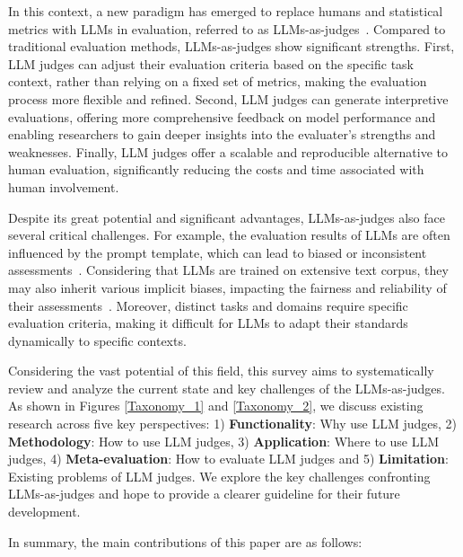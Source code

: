 In this context, a new paradigm has emerged to replace humans and statistical metrics with LLMs in evaluation, referred to as LLMs-as-judges~\cite{ashktorab2024aligning,tseng2024expert,bavaresco2024llms,bavaresco2024llms}.
Compared to traditional evaluation methods, LLMs-as-judges show significant strengths. 
First, LLM judges can adjust their evaluation criteria based on the specific task context, rather than relying on a fixed set of metrics, making the evaluation process more flexible and refined. 
Second, LLM judges can generate interpretive evaluations, offering more comprehensive feedback on model performance and enabling researchers to gain deeper insights into the evaluater's strengths and weaknesses. 
Finally, LLM judges offer a scalable and reproducible alternative to human evaluation, significantly reducing the costs and time associated with human involvement.


Despite its great potential and significant advantages, LLMs-as-judges also face several critical challenges.
For example, the evaluation results of LLMs are often influenced by the prompt template, which can lead to biased or inconsistent assessments~\cite{xu2023llm}. 
Considering that LLMs are trained on extensive text corpus, they may also inherit various implicit biases, impacting the fairness and reliability of their assessments~\cite{ye2024justice}. 
Moreover, distinct tasks and domains require specific evaluation criteria, making it difficult for LLMs to adapt their standards dynamically to specific contexts.


Considering the vast potential of this field, 
this survey aims to systematically review and analyze the current state and key challenges of the LLMs-as-judges. 
As shown in Figures \ref{Taxonomy_1} and \ref{Taxonomy_2}, we discuss existing research across five key perspectives: 1) \textbf{Functionality}: Why use LLM judges, 2) \textbf{Methodology}: How to use LLM judges, 3) \textbf{Application}: Where to use LLM judges, 4) \textbf{Meta-evaluation}: How to evaluate LLM judges and 5) \textbf{Limitation}: Existing problems of LLM judges. We explore the key challenges confronting LLMs-as-judges and hope to provide a clearer guideline for their future development.

In summary, the main contributions of this paper are as follows:

